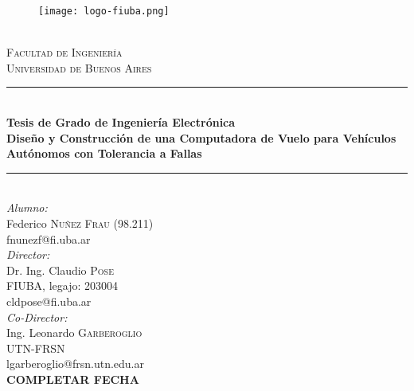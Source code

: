 \begin{titlepage}
\newcommand{\HRule}{\rule{\linewidth}{0.5mm}}
\center
\begin{figure}[H]
    \centering
    \texttt{[image: logo-fiuba.png]}
\end{figure}
\qquad \\[0.1cm]

\textsc{\LARGE Facultad de Ingeniería}\\[0.5cm]
\textsc{\Large Universidad de Buenos Aires}\\[0.6cm]
\HRule \\[0.3cm]
{ \Large \bfseries Tesis de Grado de Ingeniería Electrónica} \\[0.3cm]
{ \Large \bfseries Diseño y Construcción de una Computadora de Vuelo para Vehículos Autónomos con Tolerancia a Fallas}\\[0.1cm]
\HRule \\[0.2cm]
\Large \emph{Alumno:}\\[0,1cm]
\large Federico \textsc{Nuñez Frau} (98.211) \\
\normalsize fnunezf@fi.uba.ar\\[0.25cm]
\Large \emph{Director:}\\[0,1cm]
\large Dr. Ing. Claudio \textsc{Pose} \\[0.25cm]
\normalsize FIUBA, legajo: 203004\\
\normalsize cldpose@fi.uba.ar\\[0.25cm]
\Large \emph{Co-Director:}\\[0,1cm]
\large Ing. Leonardo \textsc{Garberoglio} \\[0.25cm]
\normalsize UTN-FRSN\\
\normalsize lgarberoglio@frsn.utn.edu.ar\\[0.25cm]
\vfill
\normalsize \textbf{{\color{red} COMPLETAR FECHA}}
\end{titlepage}
